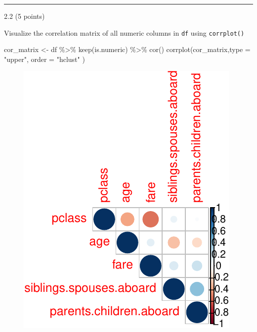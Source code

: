 \documentclass[
  letterpaper,
  DIV=11,
  numbers=noendperiod]{scrartcl}
\newenvironment{Shaded}{\begin{snugshade}}{\end{snugshade}}
\newcommand{\AttributeTok}[1]{\textcolor[rgb]{0.40,0.45,0.13}{#1}}
\newcommand{\FunctionTok}[1]{\textcolor[rgb]{0.28,0.35,0.67}{#1}}
\newcommand{\NormalTok}[1]{\textcolor[rgb]{0.00,0.23,0.31}{#1}}
\newcommand{\OtherTok}[1]{\textcolor[rgb]{0.00,0.23,0.31}{#1}}
\newcommand{\SpecialCharTok}[1]{\textcolor[rgb]{0.37,0.37,0.37}{#1}}
\newcommand{\StringTok}[1]{\textcolor[rgb]{0.13,0.47,0.30}{#1}}
\begin{document}
\begin{center}\rule{0.5\linewidth}{0.5pt}\end{center}

2.2 (5 points)

Visualize the correlation matrix of all numeric columns in \texttt{df}
using \texttt{corrplot()}

\begin{Shaded}
\begin{Highlighting}[]
\NormalTok{cor\_matrix }\OtherTok{\textless{}{-}}\NormalTok{ df }\SpecialCharTok{\%\textgreater{}\%} 
  \FunctionTok{keep}\NormalTok{(is.numeric) }\SpecialCharTok{\%\textgreater{}\%}
  \FunctionTok{cor}\NormalTok{()}
\FunctionTok{corrplot}\NormalTok{(cor\_matrix,}\AttributeTok{type =} \StringTok{"upper"}\NormalTok{, }\AttributeTok{order =} \StringTok{"hclust"}\NormalTok{ )}
\end{Highlighting}
\end{Shaded}

\begin{figure}[H]

{\centering \includegraphics{index_files/figure-pdf/unnamed-chunk-8-1.pdf}

}

\end{figure}
\end{document}
